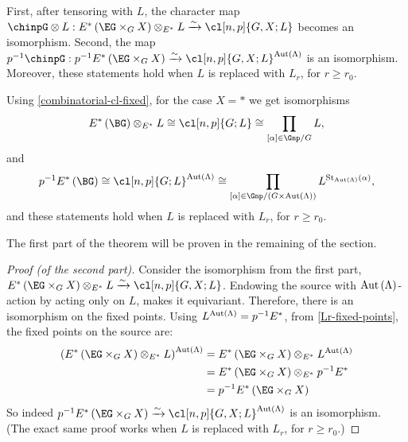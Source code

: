 \begin{theorem}\label{theorem-c}
	First, after tensoring with $L$, the character map
	$\chinpG \otimes L: E^*\left(\EG \times_G X\right) \otimes_{E^*} L \xrightarrow{\sim} \cl[n,p]{G,X; L}$
	becomes an isomorphism.
	Second, the map
	$p^{-1}\chinpG: p^{-1} E^*\left(\EG \times_G X\right) \xrightarrow{\sim} \cl[n,p]{G,X; L}^{\aut \left(\Lambda\right)}$
	is an isomorphism.
	Moreover, these statements hold when $L$ is replaced with $L_r$, for $r \geq r_0$.
\end{theorem}

\begin{corollary}\label{theorem-c-pt}
	Using \ref{combinatorial-cl-fixed}, for the case $X = *$ we get isomorphisms
	$$
	E^*\left(\BG\right) \otimes_{E^*} L
	\cong \cl[n,p]{G; L}
	\cong \prod_{\left[\alpha\right] \in \Gnp/G} L,
	$$
	and
	$$
	p^{-1} E^*\left(\BG\right)
	\cong \cl[n,p]{G; L}^{\aut \left(\Lambda\right)}
	\cong \prod_{\left[\alpha\right] \in \Gnp/{\left(G \times \aut \left(\Lambda\right)\right)}}
	L^{\stab_{\aut \left(\Lambda\right)}\left(\alpha\right)},
	$$
	and these statements hold when $L$ is replaced with $L_r$, for $r \geq r_0$.
\end{corollary}

The first part of the theorem will be proven in the remaining of the section.

\begin{proof}[Proof (of the second part)]
	Consider the isomorphism from the first part,
	$E^*\left(\EG \times_G X\right) \otimes_{E^*} L \xrightarrow{\sim} \cl[n,p]{G,X; L}$.
	Endowing the source with $\operatorname{Aut} \left(\Lambda\right)$-action by acting only on $L$, makes it equivariant.
	Therefore, there is an isomorphism on the fixed points.
	Using $L^{\operatorname{Aut} \left(\Lambda\right)} = p^{-1} E^*$, from \ref{Lr-fixed-points}, the fixed points on the source are:
	\begin{align*}
		\left(E^*\left(\EG \times_G X\right) \otimes_{E^*} L\right)^{\aut \left(\Lambda\right)}
		&= E^*\left(\EG \times_G X\right) \otimes_{E^*} L^{\aut \left(\Lambda\right)}\\
		&= E^*\left(\EG \times_G X\right) \otimes_{E^*} p^{-1} E^*\\
		&= p^{-1} E^*\left(\EG \times_G X\right)
	\end{align*}
	So indeed $p^{-1} E^*\left(\EG \times_G X\right) \xrightarrow{\sim} \cl[n,p]{G,X; L}^{\aut \left(\Lambda\right)}$ is an isomorphism.
	(The exact same proof works when $L$ is replaced with $L_r$, for $r \geq r_0$.)
\end{proof}



